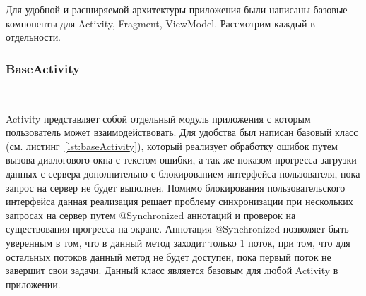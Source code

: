 Для удобной и расширяемой архитектуры приложения были написаны базовые компоненты для Activity, Fragment, ViewModel. Рассмотрим каждый в отдельности.

\subsubsection{BaseActivity}~\par
Activity представляет собой отдельный модуль приложения с которым пользователь может взаимодействовать. Для удобства был написан базовый класс (см. листинг~\ref{lst:baseActivity}), который реализует обработку ошибок путем вызова диалогового окна с текстом ошибки, а так же показом прогресса загрузки данных с сервера дополнительно с блокированием интерфейса пользователя, пока запрос на сервер не будет выполнен. Помимо блокирования пользовательского интерфейса данная реализация решает проблему синхронизации при нескольких запросах на сервер путем @Synchronized аннотаций и проверок на существования прогресса на экране. Аннотация @Synchronized позволяет быть уверенным в том, что в данный метод заходит только 1 поток, при том, что для остальных потоков данный метод не будет доступен, пока первый поток не завершит свои задачи. Данный класс является базовым для любой Activity в приложении.

